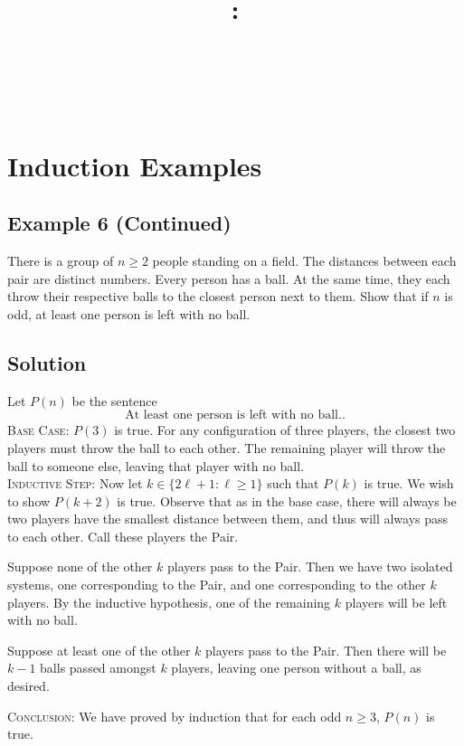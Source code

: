 \documentclass{article}
\title{
    \vspace{2in}
    \textbf{\lectClass:\\ \lectTitle}\\
    \vspace{0.1in}\large{\textit{\lectClassInstructor\ \lectSection}}
    \vspace{3in}
    \author{\textbf{\lectAuthorName}}
    \date{}
}
\begin{document}
\maketitle
\pagebreak

\section*{Induction Examples}

\subsection*{Example 6 (Continued)}
    There is a group of $n \ge 2$ people standing on a field. The distances between each pair are distinct numbers. Every person has a ball. At the same time, they each throw their respective balls to the closest person next to them. Show that if $n$ is odd, at least one person is left with no ball.

\subsection*{Solution}
    Let $P(n)$ be the sentence $$\text{At least one person is left with no ball.}.$$
    \textsc{Base Case}: $P(3)$ is true. For any configuration of three players, the closest two players must throw the ball to each other. The remaining player will throw the ball to someone else, leaving that player with no ball. \\
    \textsc{Inductive Step}: Now let $k \in \{2\ell + 1 : \ell \ge 1\}$ such that $P(k)$ is true. We wish to show $P(k + 2)$ is true. Observe that as in the base case, there will always be two players have the smallest distance between them, and thus will always pass to each other. Call these players the Pair.
    \begin{Cases}
        \item Suppose none of the other $k$ players pass to the Pair. Then we have two isolated systems, one corresponding to the Pair, and one corresponding to the other $k$ players. By the inductive hypothesis, one of the remaining $k$ players will be left with no ball.
        \item Suppose at least one of the other $k$ players pass to the Pair. Then there will be $k - 1$ balls passed amongst $k$ players, leaving one person without a ball, as desired.
    \end{Cases}
    \textsc{Conclusion}: We have proved by induction that for each odd $n \ge 3$, $P(n)$ is true.
\end{document}
